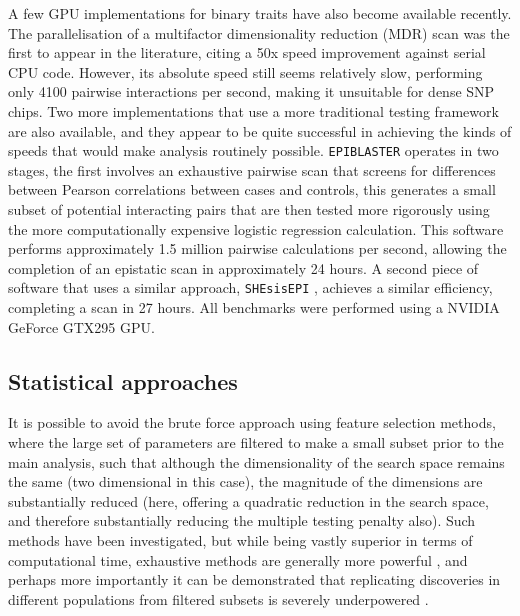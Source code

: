 A few GPU implementations for binary traits have also become available recently. The parallelisation of a multifactor dimensionality reduction (MDR) scan \citep{Sinnott-Armstrong2009} was the first to appear in the literature, citing a 50x speed improvement against serial CPU code. However, its absolute speed still seems relatively slow, performing only 4100 pairwise interactions per second, making it unsuitable for dense SNP chips. Two more implementations that use a more traditional testing framework are also available, and they appear to be quite successful in achieving the kinds of speeds that would make analysis routinely possible. {\tt EPIBLASTER} \citep{Kam-Thong2010} operates in two stages, the first involves an exhaustive pairwise scan that screens for differences between Pearson correlations between cases and controls, this generates a small subset of potential interacting pairs that are then tested more rigorously using the more computationally expensive logistic regression calculation. This software performs approximately 1.5 million pairwise calculations per second, allowing the completion of an epistatic scan in approximately 24 hours. A second piece of software that uses a similar approach, {\tt SHEsisEPI} \citep{2050244420100701}, achieves a similar efficiency, completing a scan in 27 hours. All benchmarks were performed using a NVIDIA GeForce GTX295 GPU.


\subsection{Statistical approaches}

It is possible to avoid the brute force approach using feature selection methods, where the large set of parameters are filtered to make a small subset prior to the main analysis, such that although the dimensionality of the search space remains the same (two dimensional in this case), the magnitude of the dimensions are substantially reduced (here, offering a quadratic reduction in the search space, and therefore substantially reducing the multiple testing penalty also). Such methods have been investigated, but while being vastly superior in terms of computational time, exhaustive methods are generally more powerful \citep{Marchini2005, Evans2006}, and perhaps more importantly it can be demonstrated that replicating discoveries in different populations from filtered subsets is severely underpowered \citep{Greene2009}.


